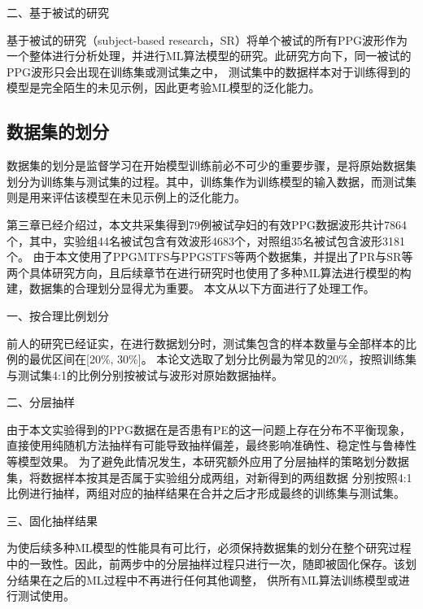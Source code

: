 二、基于被试的研究

基于被试的研究（subject-based research，SR）将单个被试的所有PPG波形作为一个整体进行分析处理，并进行ML算法模型的研究。此研究方向下，同一被试的PPG波形只会出现在训练集或测试集之中，
测试集中的数据样本对于训练得到的模型是完全陌生的未见示例，因此更考验ML模型的泛化能力。

\subsection{数据集的划分}
数据集的划分是监督学习在开始模型训练前必不可少的重要步骤，是将原始数据集划分为训练集与测试集的过程。其中，训练集作为训练模型的输入数据，而测试集则是用来评估该模型在未见示例上的泛化能力。

第三章已经介绍过，本文共采集得到79例被试孕妇的有效PPG数据波形共计7864个，其中，实验组44名被试包含有效波形4683个，对照组35名被试包含波形3181个。
由于本文使用了PPGMTFS与PPGSTFS等两个数据集，并提出了PR与SR等两个具体研究方向，且后续章节在进行研究时也使用了多种ML算法进行模型的构建，数据集的合理划分显得尤为重要。
本文从以下方面进行了处理工作。

一、按合理比例划分

前人的研究已经证实，在进行数据划分时，测试集包含的样本数量与全部样本的比例的最优区间在[20\%, 30\%]\cite{Gholamy2018Why7O}。
本论文选取了划分比例最为常见的20\%，按照训练集与测试集4:1的比例分别按被试与波形对原始数据抽样。

二、分层抽样

由于本文实验得到的PPG数据在是否患有PE的这一问题上存在分布不平衡现象，直接使用纯随机方法抽样有可能导致抽样偏差，最终影响准确性、稳定性与鲁棒性等模型效果\cite{Aurélien2018}。
为了避免此情况发生，本研究额外应用了分层抽样的策略划分数据集，将数据样本按其是否属于实验组分成两组，对新得到的两组数据
分别按照4:1比例进行抽样，两组对应的抽样结果在合并之后才形成最终的训练集与测试集。

三、固化抽样结果

为使后续多种ML模型的性能具有可比行，必须保持数据集的划分在整个研究过程中的一致性。因此，前两步中的分层抽样过程只进行一次，随即被固化保存。该划分结果在之后的ML过程中不再进行任何其他调整，
供所有ML算法训练模型或进行测试使用。

